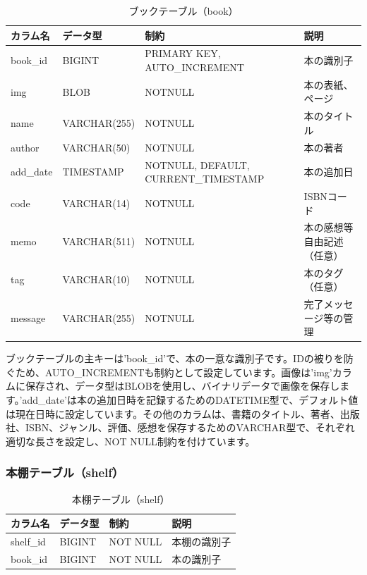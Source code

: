 \documentclass[a4paper, 11pt, titlepage]{jsarticle}
\begin{document}
\begin{table}[htbp]
  \centering
  \begin{tabular}{|l|l|>{\centering\arraybackslash}m{4cm}|>{\centering\arraybackslash}m{3cm}|}
    \hline
    \textbf{カラム名} & \textbf{データ型} & \textbf{制約} & \textbf{説明} \\
    \hline\hline
    book\_id & BIGINT & PRIMARY KEY, AUTO\_INCREMENT & 本の識別子 \\
    \hline
    img & BLOB & NOTNULL & 本の表紙、ページ \\
    \hline
    name & VARCHAR(255) & NOTNULL & 本のタイトル \\
    \hline
    author & VARCHAR(50) & NOTNULL & 本の著者 \\
    \hline
    add\_date & TIMESTAMP & NOTNULL, DEFAULT, CURRENT\_TIMESTAMP & 本の追加日 \\
    \hline
    code & VARCHAR(14) & NOTNULL & ISBNコード \\
    \hline
    memo & VARCHAR(511) & NOTNULL & 本の感想等自由記述（任意） \\
    \hline
    tag & VARCHAR(10) & NOTNULL & 本のタグ（任意） \\
    \hline
    message & VARCHAR(255) & NOTNULL & 完了メッセージ等の管理 \\
    \hline
  \end{tabular}
  \caption{ブックテーブル（book）}
  \label{tab:booktable}
\end{table}

ブックテーブルの主キーは'book\_id'で、本の一意な識別子です。IDの被りを防ぐため、AUTO\_INCREMENTも制約として設定しています。画像は'img'カラムに保存され、データ型はBLOBを使用し、バイナリデータで画像を保存します。'add\_date'は本の追加日時を記録するためのDATETIME型で、デフォルト値は現在日時に設定しています。その他のカラムは、書籍のタイトル、著者、出版社、ISBN、ジャンル、評価、感想を保存するためのVARCHAR型で、それぞれ適切な長さを設定し、NOT NULL制約を付けています。

\subsubsection{本棚テーブル（shelf）}
\begin{table}[htbp]
  \centering
  \begin{tabular}{|l|l|>{\centering\arraybackslash}m{4cm}|>{\centering\arraybackslash}m{3cm}|}
    \hline
    \textbf{カラム名} & \textbf{データ型} & \textbf{制約} & \textbf{説明} \\
    \hline\hline
    shelf\_id & BIGINT & NOT NULL & 本棚の識別子 \\
    \hline
    book\_id & BIGINT & NOT NULL & 本の識別子 \\
    \hline
  \end{tabular}
  \caption{本棚テーブル（shelf）}
  \label{tab:shelftable}
\end{table}
\end{document}
